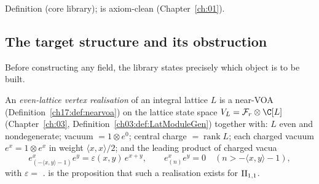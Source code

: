 \begin{status}
Definition (core library);  is axiom-clean (Chapter~\ref{ch:01}).
\end{status}

\subsection{The target structure and its obstruction}

Before constructing any field, the library states precisely which object is to be built.

\begin{definition}\label{ch17:def:target}
An \emph{even-lattice vertex realisation} of an integral lattice $L$ is a near-VOA
(Definition~\ref{ch17:def:nearvoa}) on the lattice state
space $V_L=\chseventeenF_r\otimes\C[L]$ (Chapter~\ref{ch:03}, Definition~\ref{ch03:def:LatModuleGen})
together with: $L$ even and nondegenerate; vacuum $=1\otimes e^0$; central charge $=\operatorname{rank}L$;
each charged vacuum $e^x=1\otimes e^x$ in weight $\langle x,x\rangle/2$; and the leading product of charged
vacua
\begin{equation}\label{ch17:eq:chargeleading}
  e^x_{(-\langle x,y\rangle-1)}e^y=\varepsilon(x,y)\,e^{x+y},\qquad e^x_{(n)}e^y=0\quad(n>-\langle x,y\rangle-1),
\end{equation}
with $\varepsilon=$ .   is the proposition that such a
realisation exists for ${\mathrm{II}_{1,1}}$.
\end{definition}

